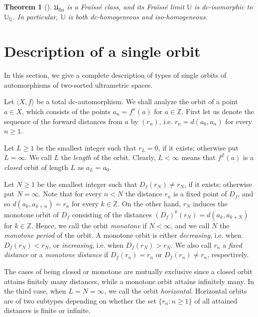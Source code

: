 \documentclass[oneside,notitlepage,12pt]{article}
\newtheorem{tw}{Theorem}[section]
\theoremstyle{definition}
\theoremstyle{remark}
\newcommand \set [1]{\{#1\}}
\newcommand \seq [1]{\langle #1 \rangle}
\newcommand \Z {\mathbb{Z}}
\newcommand \Q {\mathbb{Q}}
\newcommand \U {\mathbb{U}}
\newcommand \fin {{\operatorname{fin}}}
\newcommand \Ult {\mathfrak{U}}
\begin{document}
\begin{tw}[{\cite[Theorem~3.11]{paper1}}] \label{thm:U_Fraisse}
    $\Ult_\fin$ is a Fraïssé class, and its Fraïssé limit $\U$ is dc-isomorphic to $\U_\Q$.
    In particular, $\U$ is both dc-homogeneous and iso-homogeneous.
\end{tw}



\section{Description of a single orbit}

In this section, we give a complete description of types of single orbits of automorphisms of two-sorted ultrametric spaces.

Let $\seq{X, f}$ be a total dc-automorphism.
We shall analyze the orbit of a point $a \in X$, which consists of the points $a_n = f^n(a)$ for $a \in \Z$.
First let us denote the sequence of the forward distances from $a$ by $(r_n)$, i.e. $r_n = d(a_0, a_n)$ for every $n \geq 1$.

Let $L \geq 1$ be the smallest integer such that $r_L = 0$, if it exists; otherwise put $L = \infty$.
We call $L$ the \emph{length} of the orbit.
Clearly, $L < \infty$ means that $f^\Z(a)$ is a \emph{closed} orbit of length $L$ as $a_L = a_0$.

Let $N \geq 1$ be the smallest integer such that $D_f(r_N) \neq r_N$, if it exists; otherwise put $N = \infty$.
Note that for every $n < N$ the distance $r_n$ is a fixed point of $D_f$, and so $d(a_k, a_{k + n}) = r_n$ for every $k \in \Z$.
On the other hand, $r_N$ induces the monotone orbit of $D_f$ consisting of the distances $(D_f)^k(r_N) = d(a_k, a_{k + N})$ for $k \in \Z$.
Hence, we call the orbit \emph{monotone} if $N < \infty$, and we call $N$ the \emph{monotone period} of the orbit.
A monotone orbit is either \emph{decreasing}, i.e. when $D_f(r_N) < r_N$, or \emph{increasing}, i.e. when $D_f(r_N) > r_N$.
We also call $r_n$ a \emph{fixed distance} or a \emph{monotone distance} if $D_f(r_n) = r_n$ or $D_f(r_n) \neq r_n$, respectively.

The cases of being closed or monotone are mutually exclusive since a closed orbit attains finitely many distances, while a monotone orbit attains infinitely many.
In the third case, when $L = N = \infty$, we call the orbit \emph{horizontal}.
Horizontal orbits are of two subtypes depending on whether the set $\set{r_n: n \geq 1}$ of all attained distances is finite or infinite.
\end{document}
